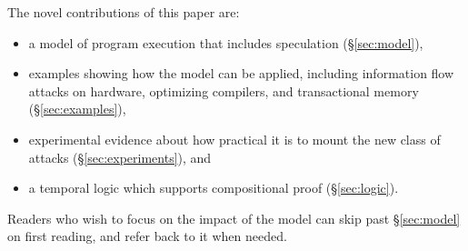 The novel contributions of this paper are:
\begin{itemize}

\item a model of program execution that includes speculation (\S\ref{sec:model}),

\item examples showing how the model can be applied,
  including information flow attacks on
  hardware, optimizing compilers, and transactional memory (\S\ref{sec:examples}),

\item experimental evidence about how practical it is to mount
  the new class of attacks (\S\ref{sec:experiments}), and

\item a temporal logic which supports compositional proof (\S\ref{sec:logic}).

\end{itemize}
Readers who wish to focus on the impact of the model can skip past \S\ref{sec:model}
on first reading, and refer back to it when needed.
